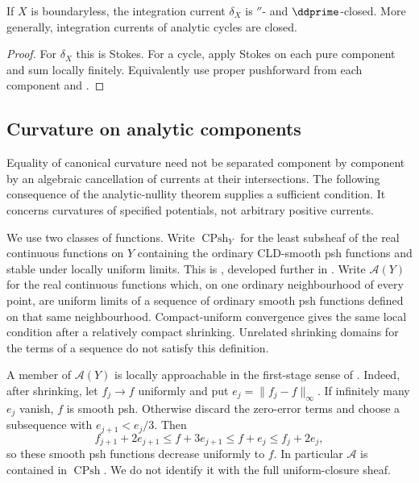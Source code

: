 \begin{proposition}
\label{prop:current-cycle-closed}
If $X$ is boundaryless, the integration current $\delta_X$ is
$\dprime$- and $\ddprime$-closed.  More generally, integration currents of
analytic cycles are closed.
\end{proposition}
\begin{proof}
For $\delta_X$ this is Stokes.  For a cycle, apply Stokes on each pure
component and sum locally finitely.  Equivalently use proper pushforward from
each component and .
\end{proof}

\subsection{Curvature on analytic components}
\label{sec:ch14-component-curvature}

Equality of canonical curvature need not be separated component by component
by an algebraic cancellation of currents at their intersections.  The
following consequence of the analytic-nullity theorem
\cite[Corollary~16.9.4]{CLD25} supplies a sufficient condition.  It concerns
curvatures of specified potentials, not arbitrary positive currents.

We use two classes of functions.  Write
$\operatorname{CPsh}_Y$ for the least subsheaf of the real continuous
functions on $Y$ containing the ordinary CLD-smooth psh functions and stable
under locally uniform limits.  This is
\cite[Definition~8.1.7 and Lemma~8.1.8]{CLD25}, developed further in
.
Write $\mathscr A(Y)$ for the real continuous functions which, on one
ordinary neighbourhood of every point, are uniform limits of a sequence of
ordinary smooth psh functions defined on that same neighbourhood.
Compact-uniform convergence gives the same local condition after a
relatively compact shrinking.  Unrelated shrinking domains for the terms
of a sequence do not satisfy this definition.

A member of $\mathscr A(Y)$ is locally approachable in the first-stage
sense of \cite[Definition~8.1.13]{CLD25}.  Indeed, after shrinking, let
$f_j\to f$ uniformly and put $e_j=\|f_j-f\|_\infty$.  If infinitely many
$e_j$ vanish, $f$ is smooth psh.  Otherwise discard the zero-error terms
and choose a subsequence with $e_{j+1}<e_j/3$.  Then
\[
 f_{j+1}+2e_{j+1}
 \leq f+3e_{j+1}
 \leq f+e_j
 \leq f_j+2e_j,
\]
so these smooth psh functions decrease uniformly to $f$.  In particular
$\mathscr A$ is contained in $\operatorname{CPsh}$.  We do not identify it
with the full uniform-closure sheaf.

